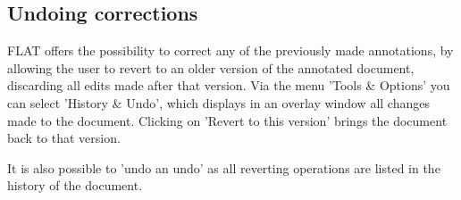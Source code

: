 \documentclass[a4paper,11pt]{article}
\begin{document}
\subsection{Undoing corrections}

FLAT offers the possibility to correct any of the previously made
annotations, by allowing the user to revert to an older version of the
annotated document, discarding all edits made after that version. Via
the menu 'Tools \& Options' you can select 'History \& Undo', which
displays in an overlay window all changes made to the
document. Clicking on 'Revert to this version' brings the document
back to that version.

It is also possible to 'undo an undo' as all reverting operations are
listed in the history of the document.


\end{document}
